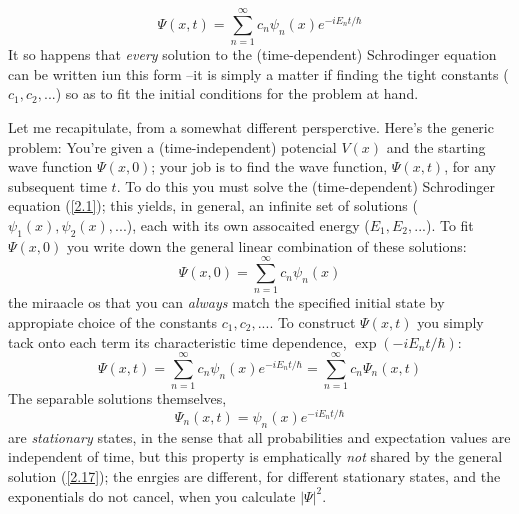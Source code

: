 	\begin{equation}\label{2.15}
	\Psi(x,t)=\sum_{n=1}^\infty c_n\psi_n(x)e^{-iE_nt/\hbar}
\end{equation}
It so happens that \textit{every} solution to the (time-dependent) Schrodinger equation can be written iun this form --it is simply a matter if finding the tight constants ($c_1,c_2,...$) so as to fit the initial conditions for the problem at hand.

Let me recapitulate, from a somewhat different persperctive. Here's the generic problem: You're given a (time-independent) potencial $V(x)$ and the starting wave function $\Psi(x,0)$; your job is to find the wave function, $\Psi(x,t)$, for any subsequent time $t$. To do this you must solve the (time-dependent) Schrodinger equation (\ref{2.1}); this yields, in general, an infinite set of solutions ($\psi_1(x),\psi_2(x),...$), each with its own assocaited energy ($E_1,E_2,...$). To fit $\Psi(x,0)$ you write down the general linear combination of these solutions:
\begin{equation}\label{2.16}
	\Psi(x,0)=\sum_{n=1}^\infty c_n\psi_n(x)
\end{equation}
the miraacle os that you can \textit{always} match the specified initial state by appropiate choice of the constants $c_1,c_2,...$. To construct $\Psi(x,t)$ you simply tack onto each term its characteristic time dependence, $\exp(-iE_nt/\hbar)$:
\begin{equation}\label{2.17}
	\boxed{\Psi(x,t)=\sum_{n=1}^\infty c_n\psi_n(x)e^{-iE_nt/\hbar}=\sum_{n=1}^\infty c_n\Psi_n(x,t)}
\end{equation}
The separable solutions themselves,
\begin{equation}\label{2.18}
	\Psi_n(x,t)=\psi_n(x)e^{-iE_nt/\hbar}
\end{equation}
are \textit{stationary} states, in the sense that all probabilities and expectation values are independent of time, but this property is emphatically \textit{not} shared by the general solution (\ref{2.17}); the enrgies are different, for different stationary states, and the exponentials do not cancel, when you calculate $|\Psi|^2$.

